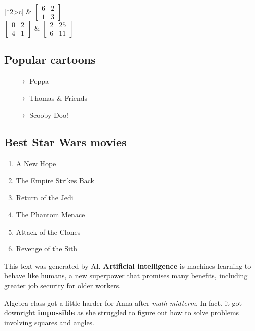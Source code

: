 \begin{center}

\begingroup
\renewcommand{\arraystretch}{4}
\begin{tabular}{|*2{>{\renewcommand{\arraystretch}{1}}c|}}
\hline
{} & $\left[ \begin{array}{cc} 6 & 2 \\ 1 & 3  \end{array}\right]$\\
\hline
$\left[ \begin{array}{cc} 0 & 2  \\ 4 & 1 \end{array}\right]$ & $\left[ \begin{array}{cc} 2 & 25  \\ 6 & 11 \end{array}\right]$ \\
\hline
\end{tabular}
\endgroup

\vspace{1cm}

\subsection*{Popular cartoons}
\centering
\begin{itemize}
    \item[$\rightarrow$] Peppa
    \item[$\rightarrow$] Thomas \& Friends
    \item[$\rightarrow$] Scooby-Doo!
\end{itemize}

\vspace{1cm}

\subsection*{Best Star Wars movies}
\begin{enumerate}
    \item A New Hope
    \item The Empire Strikes Back
    \item Return of the Jedi
    \item The Phantom Menace
    \item Attack of the Clones
    \item Revenge of the Sith
\end{enumerate}

\end{center}

\vspace{1cm}

{\footnotesize This text was generated by AI}. \textbf{Artificial intelligence} is machines learning to behave like humans, a new superpower that promises many benefits, including greater job security for older workers.

Algebra class got a little harder for Anna after \textit{math midterm}. In fact, it got downright \textbf{impossible} as she struggled to figure out how to solve problems involving squares and angles.